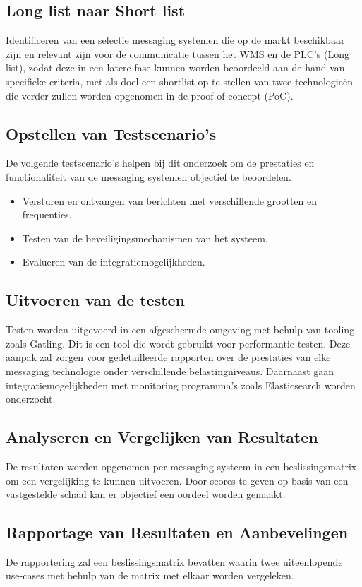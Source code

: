\subsection{Long list naar Short list}
Identificeren van een selectie messaging systemen die op de markt beschikbaar zijn en relevant zijn voor de communicatie tussen 
het WMS en de PLC's (Long list), zodat deze in een latere fase kunnen worden beoordeeld aan de hand van specifieke criteria, 
met als doel een shortlist op te stellen van twee technologieën die verder zullen worden opgenomen in de proof of concept (PoC).

\subsection{Opstellen van Testscenario's}
De volgende testscenario's helpen bij dit onderzoek om de prestaties en functionaliteit van de messaging systemen 
objectief te beoordelen.

\begin{itemize}
  \item Versturen en ontvangen van berichten met verschillende grootten en frequenties.
  \item Testen van de beveiligingsmechanismen van het systeem.
  \item Evalueren van de integratiemogelijkheden.
 \end{itemize}

\subsection{Uitvoeren van de testen}
Testen worden uitgevoerd in een afgeschermde omgeving met behulp van tooling zoals Gatling.
Dit is een tool die wordt gebruikt voor performantie testen.
Deze aanpak zal zorgen voor gedetailleerde rapporten over de prestaties van elke messaging technologie onder verschillende belastingniveaus. 
Daarnaast gaan integratiemogelijkheden met monitoring programma's zoals Elasticsearch worden onderzocht.

\subsection{Analyseren en Vergelijken van Resultaten}
De resultaten worden opgenomen per messaging systeem in een beslissingsmatrix om een vergelijking te kunnen uitvoeren. 
Door scores te geven op basis van een vastgestelde schaal kan er objectief een oordeel worden gemaakt.

\subsection{Rapportage van Resultaten en Aanbevelingen}
De rapportering zal een beslissingsmatrix bevatten waarin twee uiteenlopende use-cases met behulp van de 
matrix met elkaar worden vergeleken.

